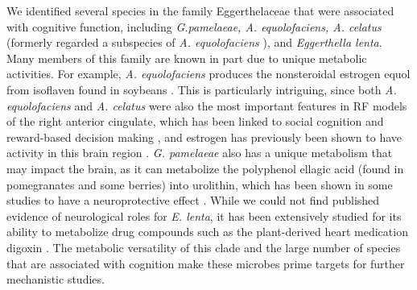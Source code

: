 \documentclass{article}
\begin{document}
We identified several species in the family Eggerthelaceae that were
associated with cognitive function, including \emph{G.pamelaeae, A. equolofaciens, A. celatus}
(formerly regarded a subspecies of \emph{A. equolofaciens}
\cite{takahashiCompleteGenomeSequence2021}),
and \emph{Eggerthella lenta}. Many members of this family are
known in part due to unique metabolic activities. For example, \emph{A.
equolofaciens} produces the nonsteroidal estrogen equol from isoflaven
found in soybeans \cite{wangEnantioselectiveSynthesisSEquol2005}.
This is particularly intriguing, since both \emph{A. equolofaciens} and \emph{A. celatus}
were also the most important features in RF models of the
right anterior cingulate, which has been linked to social cognition
and reward-based decision making \cite{appsAnteriorCingulateGyrus2016,boesRightAnteriorCingulate2008,bushDorsalAnteriorCingulate2002},
and estrogen has previously been shown to have activity 
in this brain region \cite{xiaoEstrogenAnteriorCingulate2013}.
\emph{G. pamelaeae} also has a unique metabolism that may impact the brain,
as it can metabolize the polyphenol ellagic acid
(found in pomegranates and some berries) into urolithin, which has been
shown in some studies to have a neuroprotective effect
\cite{gongUrolithinAlleviatesBloodbrain2022,selmaDescriptionUrolithinProduction2014}.
While we could not find published evidence of neurological roles for \emph{E. lenta},
it has been extensively studied for
its ability to metabolize drug compounds such as the plant-derived heart
medication digoxin \cite{haiserPredictingManipulatingCardiac2013}.
The metabolic versatility of this clade and the large number of
species that are associated with cognition make these microbes prime
targets for further mechanistic studies.
\end{document}
